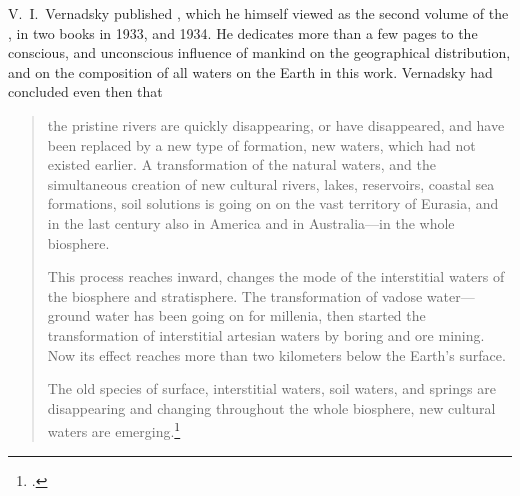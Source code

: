 V.~I.\ Vernadsky published , which he himself viewed as
the second volume of the , in two books in
1933, and 1934.  He dedicates more than a few pages to the conscious, and unconscious
influence of mankind on the geographical distribution, and on the composition
of all waters on the Earth in this work.  Vernadsky had concluded even then
that
\begin{quote}
  the pristine rivers are quickly disappearing, or have disappeared, and have
  been replaced by a new type of formation, new waters, which had not existed
  earlier.  A transformation of the natural waters, and the simultaneous
  creation of new cultural rivers, lakes, reservoirs, coastal sea formations,
  soil solutions is going on on the vast territory of Eurasia, and in the last
  century also in America and in Australia---in the whole biosphere.
  
  This process reaches inward, changes the mode of the interstitial
  waters of the biosphere and stratisphere.
  The transformation of vadose water---ground
  water has been going on for millenia,
  then started the transformation of interstitial artesian
  waters by boring and ore mining.  Now its
  effect reaches more than two kilometers below the Earth's surface.
  
  The old species of surface, interstitial waters, soil waters, and
  springs are disappearing and changing throughout the whole biosphere, new
  cultural waters are emerging.\footcite{vernadsky1960sochineniya-istoriya}
\end{quote}


